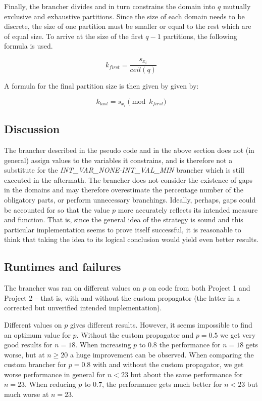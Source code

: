 \documentclass[a4paper,11pt]{article}
\begin{document}
Finally, the brancher divides and in turn constrains the domain into $q$ mutually exclusive and exhaustive partitions. Since the size of each domain needs to be discrete, the size of one partition must be smaller or equal to the rest which are of equal size. To arrive at the size of the first $q-1$ partitions, the following formula is used.

\begin{equation}
k_{first} = \frac{s_{x_i}}{ceil(q)} 
\end{equation}

A formula for the final partition size is then given by given by:

\begin{equation}
k_{last} = s_{x_i} \pmod{k_{first}}
\end{equation}

\subsection{Discussion}

The brancher described in the pseudo code and in the above section does not (in general) assign values to the variables it constrains, and is therefore not a substitute for the \emph{INT\_VAR\_NONE-INT\_VAL\_MIN} brancher which is still executed in the aftermath. The brancher does not consider the existence of gaps in the domains and may therefore overestimate the percentage number of the  obligatory parts, or perform unnecessary branchings. Ideally, perhaps, gaps could be accounted for so that the value $p$ more accurately reflects its intended measure and function. That is, since the general idea of the strategy is sound and this particular implementation seems to prove itself successful, it is reasonable to think that taking the idea to its logical conclusion would yield even better results.


\subsection{Runtimes and failures}

The brancher was ran on different values on $p$ on code from both Project 1 and Project 2 -- that is, with and without the custom propagator (the latter in a corrected but unverified intended implementation).

Different values on $p$ gives different results. However, it seems impossible to find an optimum value for $p$. Without the custom propagator and $p=0.5$ we get very good results for $n=18$. When increasing $p$ to $0.8$ the performance for $n=18$ gets worse, but at $n \geq 20$ a huge improvement can be observed. When comparing the custom brancher for $p=0.8$ with and without the custom propagator, we get worse performance in general for $n<23$ but about the same performance for $n=23$. When reducing $p$ to $0.7$, the performance gets much better for $n<23$ but much worse at $n=23$.
\end{document}
